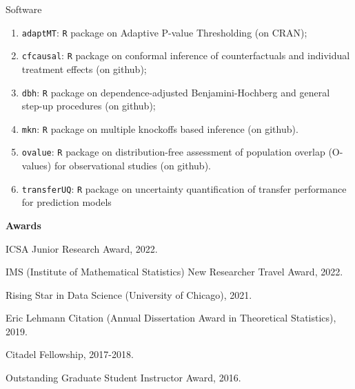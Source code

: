 \documentclass{article}
\begin{document}
\begin{large}
\noindent Software
\end{large}

\begin{enumerate}
\item \texttt{adaptMT}: \texttt{R} package on Adaptive P-value Thresholding (on CRAN);
\item \texttt{cfcausal}: \texttt{R} package on conformal inference of counterfactuals and individual treatment effects (on github);
\item \texttt{dbh}: \texttt{R} package on dependence-adjusted Benjamini-Hochberg and general step-up procedures (on github);
\item \texttt{mkn}: \texttt{R} package on multiple knockoffs based inference (on github).
\item \texttt{ovalue}: \texttt{R} package on distribution-free assessment of population overlap (O-values) for observational studies (on github).
\item \texttt{transferUQ}: \texttt{R} package on uncertainty quantification of transfer performance for prediction models
\end{enumerate}

\vspace{3mm}
\begin{large}
\noindent \textbf{Awards}
\end{large}

\vspace{5mm}

ICSA Junior Research Award, 2022.

\vspace{2mm}

IMS (Institute of Mathematical Statistics) New Researcher Travel Award, 2022.

\vspace{2mm}

Rising Star in Data Science (University of Chicago), 2021.

\vspace{2mm}

Eric Lehmann Citation (Annual Dissertation Award in Theoretical Statistics), 2019.

\vspace{2mm}

Citadel Fellowship, 2017-2018.

\vspace{2mm}

Outstanding Graduate Student Instructor Award, 2016.
\end{document}
